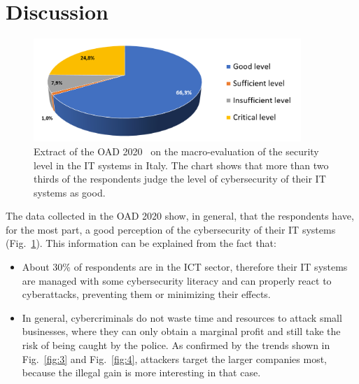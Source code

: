 \documentclass{easychair}
\begin{document}
\section{Discussion}\label{sec:DataDiscussion}

\begin{figure}
	\centering
		\includegraphics[width=0.9\textwidth]{pictures/fig1.png}
		\caption{Extract of the OAD 2020~\cite{oad20} on the macro-evaluation
                  of the security level in the IT systems in Italy.
                  The chart shows that more than two thirds of the respondents
                  judge the level of cybersecurity of their IT systems as good.}
		\label{fig:1}
\end{figure}

The data collected in the OAD 2020 show, in general, that the respondents have, for the most part,
a good perception of the cybersecurity of their IT systems (Fig.~\ref{fig:1}).
This information can be explained from the fact that:
 
\begin{itemize}
\item About 30\% of respondents are in the ICT sector, therefore their IT systems
  are managed with some cybersecurity literacy and can properly react to cyberattacks, preventing 
  them or minimizing their effects.

\item In general, cybercriminals do not waste time and resources to attack small businesses,
  where they can only obtain a marginal profit and still
  take the risk of being caught by the police.  As confirmed by the trends shown
  in Fig.~\ref{fig:3} and Fig.~\ref{fig:4}, attackers target the larger companies most,
  because the illegal gain is more interesting in that case.
\end{itemize}
\end{document}
